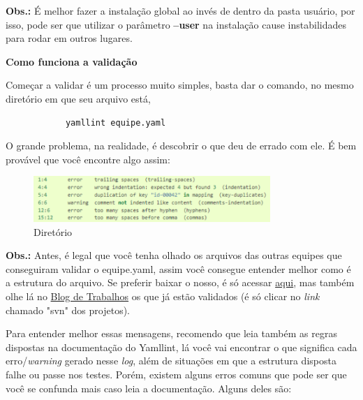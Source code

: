 \textbf{Obs.:} É melhor fazer a instalação global ao invés de dentro da pasta usuário, por isso, pode ser que utilizar o parâmetro \textbf{--user} na instalação cause instabilidades para rodar em outros lugares.

\textbf{Como funciona a validação}

Começar a validar é um processo muito simples, basta dar o comando, no mesmo diretório em que seu arquivo está, 
\lstset{language=Fortran,
             basicstyle=\ttfamily\small,
             showstringspaces=false
    }
        \begin{lstlisting} 
            yamllint equipe.yaml
        \end{lstlisting}
O grande problema, na realidade, é descobrir o que deu de errado com ele. É bem provável que você encontre algo assim:

\begin{figure}[htb]
\centering
\caption{Diretório}
\includegraphics[width=0.8\textwidth]{anexos/Imagens_Blog/diretorio.png}
\end{figure}
\FloatBarrier

\textbf{Obs.:} Antes, é legal que você tenha olhado os arquivos das outras equipes que conseguiram validar o equipe.yaml, assim você consegue entender melhor como é a estrutura do arquivo. Se preferir baixar o nosso, é só acessar \href{https://svn.spo.ifsp.edu.br/svn/a6pgp//A2022-PDS-SEG/Bunka_Bytes/equipe.yaml}{aqui}, mas também olhe lá no \href{https://dicas.ivanfm.com/aulas/blogs-de-trabalhos.html}{Blog de Trabalhos} os que já estão validados (é só clicar no \textit{link} chamado "\acs{svn}" dos projetos).

Para entender melhor essas mensagens, recomendo que leia também as regras dispostas na documentação do \gls{Yamllint}, lá você vai encontrar o que significa cada erro/\textit{warning} gerado nesse \textit{log}, além de situações em que a estrutura disposta falhe ou passe nos testes. Porém, existem alguns erros comuns que pode ser que você se confunda mais caso leia a documentação. Alguns deles são:

